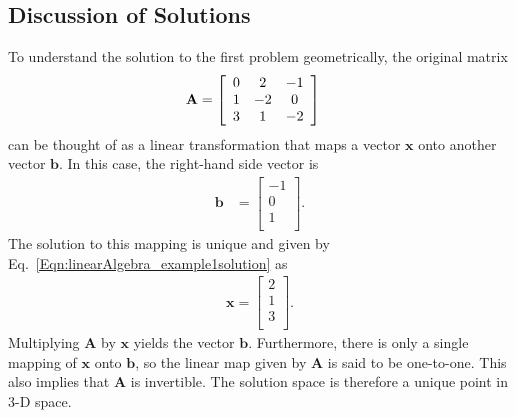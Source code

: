 \subsection{Discussion of Solutions}

To understand the solution to the first problem geometrically, the original matrix
\begin{align} 
  \mathbf{A} &=
  \left[ \begin{array}{c c c} 
  0 &  2 & -1 \\
  1 & -2 &  0 \\
  3 &  1 & -2 \\ \end{array} \right] \nonumber
\end{align}
can be thought of as a linear transformation that maps a vector $\mathbf{x}$ onto another vector $\mathbf{b}$. In this case, the right-hand side vector is
\begin{align}
  \mathbf{b} &= \left[ \begin{array}{c} -1 \\ 0 \\ 1 \\ \end{array} \right] . \nonumber
\end{align}
The solution to this mapping is unique and given by Eq.~\eqref{Eqn:linearAlgebra_example1solution} as
\begin{align} 
  \mathbf{x} =
  \left[ \begin{array}{c} 2 \\ 1 \\ 3 \\ \end{array} \right] . \nonumber
\end{align}
Multiplying $\mathbf{A}$ by $\mathbf{x}$ yields the vector $\mathbf{b}$. Furthermore, there is only a single mapping of $\mathbf{x}$ onto $\mathbf{b}$, so the linear map given by $\mathbf{A}$ is said to be one-to-one. This also implies that $\mathbf{A}$ is invertible. The solution space is therefore a unique point in 3-D space.

